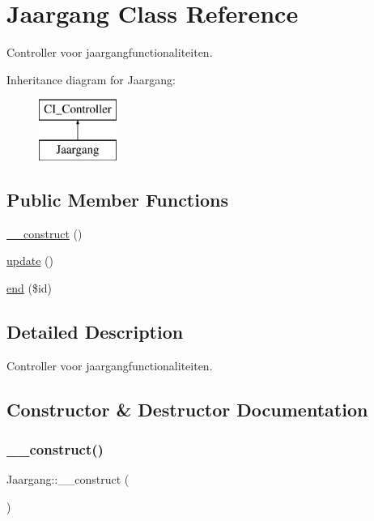 \hypertarget{class_jaargang}{}\section{Jaargang Class Reference}
\label{class_jaargang}


Controller voor jaargangfunctionaliteiten.  


Inheritance diagram for Jaargang\+:\begin{figure}[H]
\begin{center}
\leavevmode
\includegraphics[height=2.000000cm]{class_jaargang}
\end{center}
\end{figure}
\subsection*{Public Member Functions}
\begin{DoxyCompactItemize}
\item 
\mbox{\hyperlink{class_jaargang_a8fe1bec152f6d287cd70f5210ff69929}{\+\_\+\+\_\+construct}} ()
\item 
\mbox{\hyperlink{class_jaargang_aaa73e406504c88e78c151e120f2e1097}{update}} ()
\item 
\mbox{\hyperlink{class_jaargang_a3186482529d41140d9367fb78cd1b119}{end}} (\$id)
\end{DoxyCompactItemize}


\subsection{Detailed Description}
Controller voor jaargangfunctionaliteiten. 

\subsection{Constructor \& Destructor Documentation}
\mbox{\label{class_jaargang_a8fe1bec152f6d287cd70f5210ff69929}} 
\subsubsection{\texorpdfstring{\+\_\+\+\_\+construct()}{\_\_construct()}}
{\footnotesize\ttfamily Jaargang\+::\+\_\+\+\_\+construct (\begin{DoxyParamCaption}{ }\end{DoxyParamCaption})}

